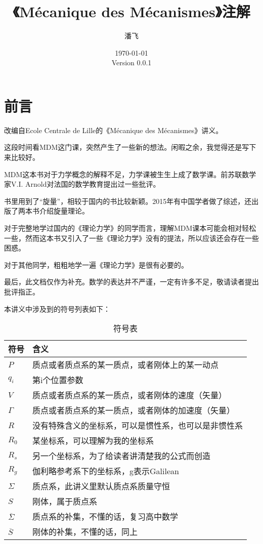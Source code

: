 \documentclass[UTF8]{ctexart}%
\title{《Mécanique des Mécanismes》注解}
\author{潘飞}
\affil{香港城市大学}
\date{\today\\Version 0.0.1}
\begin{document}
\maketitle

\tableofcontents

\newpage

\section{前言}
\label{sec:前言}
改编自Ecole Centrale de Lille的《Mécanique des Mécanismes》讲义\cite{desplanques_mecanique_2011}。

这段时间看MDM这门课，突然产生了一些新的想法。闲暇之余，我觉得还是写下来比较好。

MDM这本书对于力学概念的解释不足，力学课被生生上成了数学课。前苏联数学家V.I. Arnold对法国的数学教育提出过一些批评\cite{0036-0279-53-1-M17}。

书里用到了“旋量”，相较于国内的书比较新颖。2015年有中国学者做了综述\cite{__2015}，还出版了两本书介绍旋量理论\cite{__2014,__2014-1}。

对于完整地学过国内的《理论力学》的同学而言，理解MDM课本可能会相对轻松一些，然而这本书又引入了一些《理论力学》没有的提法，所以应该还会存在一些困惑。

对于其他同学，粗粗地学一遍《理论力学》是很有必要的。

最后，此文档仅作为补充。数学的表达并不严谨，一定有许多不足，敬请读者提出批评指正。

本讲义中涉及到的符号列表如下：

% 
\begin{table}[htbp]
\centering
\caption{符号表}
\label{符号表}
\begin{tabular}{@{}ll@{}}
\toprule
符号         & 含义                        \\ \midrule
$P$          & 质点或者质点系的某一质点，或者刚体上的某一动点   \\
$q_i$       & 第i个位置参数                   \\
$V$          & 质点或者质点系的某一质点，或者刚体的速度（矢量）  \\
$\Gamma$      & 质点或者质点系的某一质点，或者刚体的加速度（矢量） \\
$R$          & 没有特殊含义的坐标系，可以是惯性系，也可以是非惯性系   \\
$R_0$       & 某坐标系，可以理解为我的坐标系           \\
$R_s$       & 另一个坐标系，为了给读者讲清楚我的公式而创造    \\
$R_g$       & 伽利略参考系下的坐标系，g表示Galilean   \\
$\Sigma$      & 质点系，此讲义里默认质点系质量守恒         \\
$S$          & 刚体，属于质点系                  \\
$\overline{\Sigma}$ & 质点系的补集，不懂的话，复习高中数学        \\
$\overline{S}$     & 刚体的补集，不懂的话，同上             \\ \bottomrule
\end{tabular}
\end{table}
\end{document}

